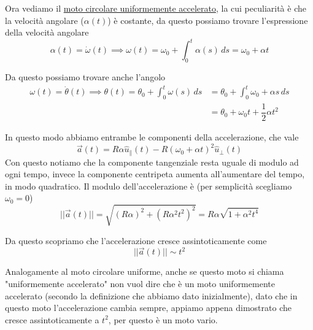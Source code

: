 \documentclass{rapport}
\begin{document}
Ora vediamo il \underline{moto circolare uniformemente accelerato}, la cui peculiarità è che la velocità angolare ($\alpha(t)$) è costante, da questo possiamo trovare l'espressione della velocità angolare
\[
\alpha(t) = \dot{\omega}(t) \implies \omega(t) = \omega_0 + \int_{0}^{t} \alpha(s) \,ds = \omega_0 + \alpha t
\]

Da questo possiamo trovare anche l'angolo 
\begin{align*}
\omega(t) = \dot{\theta}(t) \implies \theta(t) = \theta_0 + \int_{0}^{t} \omega(s)\,ds &=  \theta_0 + \int_{0}^{t} \omega_0 + \alpha s\,ds\\
  &= \theta_0 + \omega_0 t + \dfrac{1}{2}\alpha t^2
\end{align*}

In questo modo abbiamo entrambe le componenti della accelerazione, che vale
\[
\vec{a}(t) =R\alpha \hat{u}_\parallel(t) - R(\omega_0 + \alpha t)^2\hat{u}_\perp(t)
\]
Con questo notiamo che la componente tangenziale resta uguale di modulo ad ogni tempo, invece la componente centripeta aumenta all'aumentare del tempo, in modo quadratico. Il modulo dell'accelerazione è (per semplicità scegliamo $\omega_0 = 0$)
\[
||\vec{a}(t)|| = \sqrt{(R\alpha )^2 + (R\alpha^2 t^2)^2} = R\alpha\sqrt{1 + \alpha^2 t^4  }
\]

Da questo scopriamo che l'accelerazione cresce assintoticamente come 
\[
||\vec{a}(t)|| \sim t^2
\]

Analogamente al moto circolare uniforme, anche se questo moto si chiama "uniformemente accelerato" non vuol dire che è un moto uniformemente accelerato (secondo la definizione che abbiamo dato inizialmente), dato che in questo moto l'accelerazione cambia sempre, appiamo appena dimostrato che cresce assintoticamente a $t^2$, per questo è un moto vario.
\end{document}
